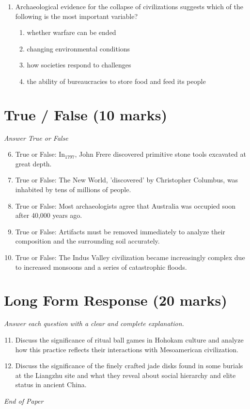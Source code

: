 \documentclass[12pt]{article}
\begin{document}
\begin{enumerate}[label=\arabic*.]
\begin{enumerate}[label=(\alph*)]
\end{enumerate}
\item Archaeological evidence for the collapse of civilizations suggests which of the following is the most important variable?
\begin{enumerate}[label=(\alph*)]
    \item whether warfare can be ended
    \item changing environmental conditions
    \item how societies respond to challenges
    \item the ability of bureaucracies to store food and feed its people
\end{enumerate}
\end{enumerate}

\section*{True / False (10 marks)}
\textit{Answer True or False}
\begin{enumerate}[label=\arabic*.]
\setcounter{enumi}{5}
\item True or False: In$_{1797}$, John Frere discovered primitive stone tools excavated at great depth.
\item True or False: The New World, 'discovered' by Christopher Columbus, was inhabited by tens of millions of people.
\item True or False: Most archaeologists agree that Australia was occupied soon after 40,000 years ago.
\item True or False: Artifacts must be removed immediately to analyze their composition and the surrounding soil accurately.
\item True or False: The Indus Valley civilization became increasingly complex due to increased monsoons and a series of catastrophic floods.
\end{enumerate}

\section*{Long Form Response (20 marks)}
\textit{Answer each question with a clear and complete explanation.}
\begin{enumerate}[label=\arabic*.]
\setcounter{enumi}{10}
\item Discuss the significance of ritual ball games in Hohokam culture and analyze how this practice reflects their interactions with Mesoamerican civilization.
\item Discuss the significance of the finely crafted jade disks found in some burials at the Liangzhu site and what they reveal about social hierarchy and elite status in ancient China.
\end{enumerate}

\vfill
\noindent\textit{End of Paper}
\end{document}
